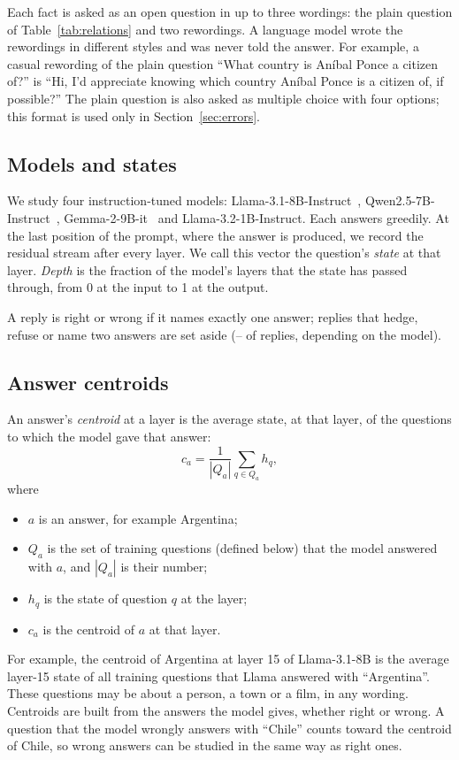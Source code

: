 Each fact is asked as an open question in up to three wordings: the plain question of Table~\ref{tab:relations} and two rewordings. A language model wrote the rewordings in different styles and was never told the answer. For example, a casual rewording of the plain question ``What country is An\'{i}bal Ponce a citizen of?'' is ``Hi, I'd appreciate knowing which country An\'{i}bal Ponce is a citizen of, if possible?'' The plain question is also asked as multiple choice with four options; this format is used only in Section~\ref{sec:errors}.

\subsection{Models and states}
\label{sec:models}
We study four instruction-tuned models: Llama-3.1-8B-Instruct~\citep{grattafiori2024the}, Qwen2.5-7B-Instruct~\citep{qwen2024qwen25}, Gemma-2-9B-it~\citep{gemma2024gemma} and Llama-3.2-1B-Instruct. Each answers greedily. At the last position of the prompt, where the answer is produced, we record the residual stream after every layer. We call this vector the question's \emph{state} at that layer. \emph{Depth} is the fraction of the model's layers that the state has passed through, from 0 at the input to 1 at the output.

A reply is right or wrong if it names exactly one answer; replies that hedge, refuse or name two answers are set aside (\UnclearMin{}--\UnclearMax{} of replies, depending on the model).

\subsection{Answer centroids}
\label{sec:places}
An answer's \emph{centroid} at a layer is the average state, at that layer, of the questions to which the model gave that answer:
\begin{equation}
c_a = \frac{1}{|Q_a|} \sum_{q \in Q_a} h_q,
\label{eq:place}
\end{equation}
where
\begin{itemize}\itemsep0pt
\item $a$ is an answer, for example Argentina;
\item $Q_a$ is the set of training questions (defined below) that the model answered with $a$, and $|Q_a|$ is their number;
\item $h_q$ is the state of question $q$ at the layer;
\item $c_a$ is the centroid of $a$ at that layer.
\end{itemize}
For example, the centroid of Argentina at layer 15 of Llama-3.1-8B is the average layer-15 state of all training questions that Llama answered with ``Argentina''. These questions may be about a person, a town or a film, in any wording. Centroids are built from the answers the model gives, whether right or wrong. A question that the model wrongly answers with ``Chile'' counts toward the centroid of Chile, so wrong answers can be studied in the same way as right ones.

